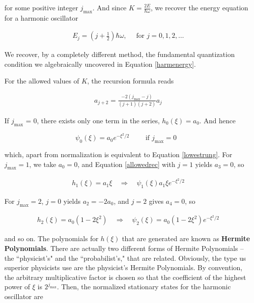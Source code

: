 for some positive integer $j_\text{max} $. And since $K
= \frac{2E}{\hbar\omega}$, we recover the energy equation for a harmonic
oscillator 

\begin{align} \label{}
  E_j = \left( j + \frac{1}{2} \right) \hbar\omega, \quad \text{ for } j = 0,
  1, 2, \hdots  
\end{align}\vspace{3px}

We recover, by a completely different method, the fundamental quantization
condition we algebraically uncovered in Equation \ref{harmenergy}. 

For the allowed values of $K$, the recursion formula reads

\begin{align} \label{allowedrec}
  a_{j+2} = \frac{-2(j_\text{max} - j)}{(j+1)(j+2)}a_j
\end{align}\vspace{3px} 

If $j_\text{max} $ = 0, there exists only one term in the series, $h_0(\xi)
= a_0$. And hence 

\[
  \psi_0(\xi) = a_0e^{-\xi^2 / 2} \qquad \text{ if $j_\text{max} = 0 $ }
\] \vspace{3px}

which, apart from normalization is equivalent to Equation \ref{lowestrung}. For
$j_\text{max} =1$, we take $a_0 = 0$, and Equation \ref{allowedrec} with $j=1$ yields $a_3
= 0$, so 

\begin{align} \label{}
  h_1(\xi) = a_1\xi \quad \Rightarrow \quad \psi_1(\xi) a_1\xi e^{-\xi^2 / 2}
\end{align}\vspace{3px}

For $j_\text{max} = 2$, $j=0$ yields $a_2 = -2a_0$, and $j=2$ gives $a_4 = 0$,
so 

\begin{align} \label{}
  h_2(\xi) = a_0 \left( 1 - 2\xi^2 \right) \quad \Rightarrow \quad \psi_2(\xi)
  = a_0 (1-2\xi^2) e^{-\xi^2 / 2}
\end{align}\vspace{3px}   

and so on. The polynomials for $h(\xi)$ that are generated are known as
\textbf{Hermite Polynomials}. There are actually two different forms of Hermite
Polynomials -- the ``physicist's" and the ``probabilist's," that are related.
Obviously, the type us superior physicists use are the physicist's Hermite
Polynomials. By convention, the arbitrary multiplicative factor is chosen so
that the coefficient of the highest power of $\xi$ is $2^{j_\text{max} }$.
Then, the normalized stationary states for the harmonic oscillator are 

